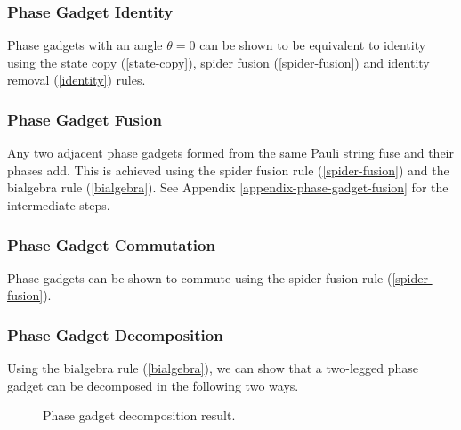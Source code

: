 
\subsubsection{Phase Gadget Identity}%
\label{phase-gadget-identity}

Phase gadgets with an angle $\theta = 0$ can be shown to be equivalent to identity using the state copy (\ref{state-copy}), spider fusion (\ref{spider-fusion}) and identity removal (\ref{identity}) rules.



\subsubsection{Phase Gadget Fusion}%
\label{phase-gadget-fusion}

Any two adjacent phase gadgets formed from the same Pauli string fuse and their phases add. This is achieved using the spider fusion rule (\ref{spider-fusion}) and the bialgebra rule (\ref{bialgebra}). See Appendix  \ref{appendix-phase-gadget-fusion} for the intermediate steps.



\subsubsection{Phase Gadget Commutation}%
\label{phase-gadget-commutation}

Phase gadgets can be shown to commute using the spider fusion rule (\ref{spider-fusion}).



\subsubsection{Phase Gadget Decomposition}%

Using the bialgebra rule (\ref{bialgebra}), we can show that a two-legged phase gadget can be decomposed in the following two ways.

\begin{figure}[H]
    \centering
    \caption{Phase gadget decomposition result.}
    \label{phase-gadget-decomposition}
\end{figure}

